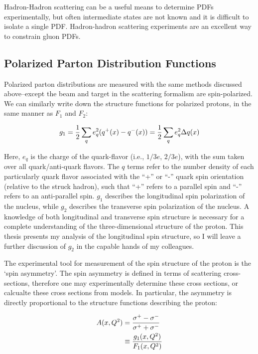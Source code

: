 Hadron-Hadron scattering can be a useful means to determine PDFs experimentally,
but often intermediate states are not known and it is difficult to isolate a
single PDF. Hadron-hadron scattering experiments are an excellent way to
constrain gluon PDFs.

\subsection{Polarized Parton Distribution Functions}
\label{sec:polarized_parton_distribution_functions}

Polarized parton distributions are measured with the same methods discussed
above--except the beam and target in the scattering formalism are
spin-polarized. We can similarly write down the structure functions for
polarized protons, in the same manner as $F_1$ and $F_2$:

\begin{equation}
  g_1 = {1 \over 2}\sum_q e_q^2(q^+(x)-q^-(x)) 
  = {1 \over 2} \sum_q e^2_q\Delta q(x)
  \label{eq:g1}
\end{equation}

Here, $e_q$ is the charge of the quark-flavor (i.e., $1/3e$, $2/3e$), with the
sum taken over all quark/anti-quark flavors. The $q$ terms refer to the number
density of each particularly quark flavor associated with the ``+'' or ``-'' quark
spin orientation (relative to the struck hadron), such that ``+'' refers to a
parallel spin and ``-'' refers to an anti-parallel spin. $g_1$ describes the
longitudinal spin polarization of the nucleus, while $g_2$ describes the
transverse spin polarization of the nucleus. A knowledge of both longitudinal
and transverse spin structure is necessary for a complete understanding of the
three-dimensional structure of the proton. This thesis presents my analysis of
the longitudinal spin structure, so I will leave a further discussion of $g_2$
in the capable hands of my colleagues.  

The experimental tool for measurement of the spin structure of the proton is the
`spin asymmetry'. The spin asymmetry is defined in terms of scattering
cross-sections, therefore one may experimentally determine these cross sections,
or calcualte these cross sections from models. In particular, the asymmetry is
directly proportional to the structure functions describing the proton:

\begin{align}
  A(x,Q^2) &= 
  {{\sigma^+-\sigma^-}\over{\sigma^++\sigma^-}} \label{eq:al_simple} \\
           &\equiv 
  {{g_1(x,Q^2)}\over{F_1(x,Q^2)}} \label{eq:al_structure}
\end{align}

